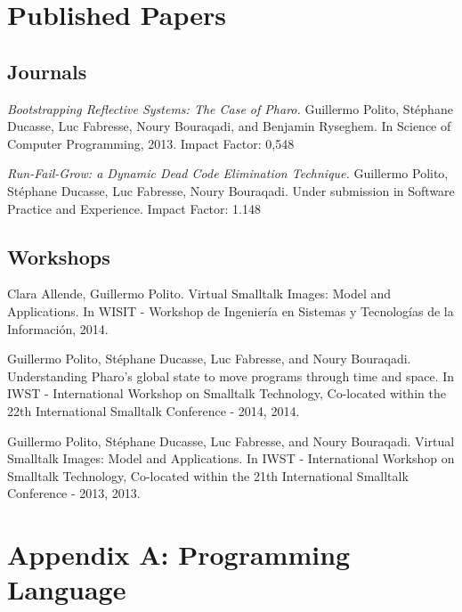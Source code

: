 
\appendix

\chapter{Published Papers}
\label{papers}


\section{Journals}

\emph{Bootstrapping Reflective Systems: The Case of Pharo.}\newline
Guillermo Polito, Stéphane Ducasse, Luc Fabresse, Noury Bouraqadi, and Benjamin Ryseghem.\newline
In Science of Computer Programming, 2013. Impact Factor: 0,548\newline

\noindent \emph{Run-Fail-Grow: a Dynamic Dead Code Elimination Technique.}\newline
Guillermo Polito, Stéphane Ducasse, Luc Fabresse, Noury Bouraqadi.\newline
Under submission in Software Practice and Experience. Impact Factor: 1.148

\section{Workshops}

Clara Allende, Guillermo Polito. Virtual Smalltalk Images: Model and Applications. In WISIT - Workshop de Ingeniería en Sistemas y Tecnologías de la Información, 2014.

Guillermo Polito, Stéphane Ducasse, Luc Fabresse, and Noury Bouraqadi. Understanding Pharo’s global state to move programs through time and space. In IWST - International Workshop on Smalltalk Technology, Co-located within the 22th International Smalltalk Conference - 2014, 2014.

Guillermo Polito, Stéphane Ducasse, Luc Fabresse, and Noury Bouraqadi. Virtual Smalltalk Images: Model and Applications. In IWST - International Workshop on Smalltalk Technology, Co-located within the 21th International Smalltalk Conference - 2013, 2013.


\chapter{Appendix A: \PH Programming Language}
\label{appendixa}

